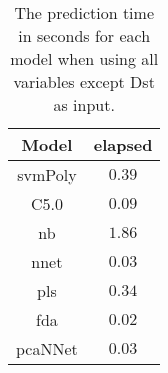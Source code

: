 \begin{table}[!ht]
	\centering
	\begin{tabular}{|c|c|}
		\hline
		Model & elapsed \\ \hline
		svmPoly & $0.39$ \\ \hline
		C5.0 & $0.09$ \\ \hline
		nb & $1.86$ \\ \hline
		nnet & $0.03$ \\ \hline
		pls & $0.34$ \\ \hline
		fda & $0.02$ \\ \hline
		pcaNNet & $0.03$ \\ \hline
	\end{tabular}
	\caption{The prediction time in seconds for each model when using all variables except Dst as input.}
	\label{tab:time:noDst:predict}
\end{table}
